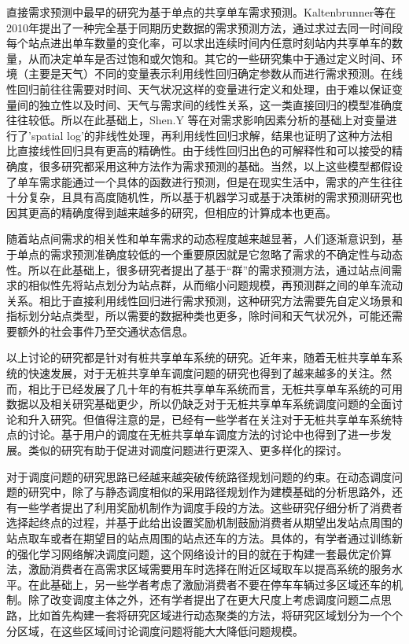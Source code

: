 \documentclass[]{tongjithesis}
\numberwithin{equation}{chapter}
\begin{document}
直接需求预测中最早的研究为基于单点的共享单车需求预测。Kaltenbrunner等在2010年提出了一种完全基于同期历史数据的需求预测方法\cite{kaltenbrunner2010urban}，通过求过去同一时间段每个站点进出单车数量的变化率，可以求出连续时间内任意时刻站内共享单车的数量，从而决定单车是否过饱和或欠饱和。其它的一些研究集中于通过定义时间、环境（主要是天气）不同的变量表示利用线性回归确定参数从而进行需求预测。在线性回归前往往需要对时间、天气状况这样的变量进行定义和处理，由于难以保证变量间的独立性以及时间、天气与需求间的线性关系，这一类直接回归的模型准确度往往较低。所以在此基础上，Shen.Y 等在对需求影响因素分析的基础上对变量进行了’spatial log’的非线性处理，再利用线性回归求解，结果也证明了这种方法相比直接线性回归具有更高的精确性\cite{shen2018understanding}。由于线性回归出色的可解释性和可以接受的精确度，很多研究都采用这种方法作为需求预测的基础。当然，以上这些模型都假设了单车需求能通过一个具体的函数进行预测，但是在现实生活中，需求的产生往往十分复杂，且具有高度随机性，所以基于机器学习\cite{xu2020hybrid}或基于决策树\cite{ve2020rule}的需求预测研究也因其更高的精确度得到越来越多的研究，但相应的计算成本也更高。

随着站点间需求的相关性和单车需求的动态程度越来越显著，人们逐渐意识到，基于单点的需求预测准确度较低的一个重要原因就是它忽略了需求的不确定性与动态性。所以在此基础上，很多研究者提出了基于“群”的需求预测方法\cite{chen2016dynamic,hulot2018towards}，通过站点间需求的相似性先将站点划分为站点群，从而缩小问题规模，再预测群之间的单车流动关系。相比于直接利用线性回归进行需求预测，这种研究方法需要先自定义场景和指标划分站点类型，所以需要的数据种类也更多，除时间和天气状况外，可能还需要额外的社会事件乃至交通状态信息。

以上讨论的研究都是针对有桩共享单车系统的研究。近年来，随着无桩共享单车系统的快速发展，对于无桩共享单车调度问题的研究也得到了越来越多的关注。然而，相比于已经发展了几十年的有桩共享单车系统而言，无桩共享单车系统的可用数据以及相关研究基础更少，所以仍缺乏对于无桩共享单车系统调度问题的全面讨论和升入研究。但值得注意的是，已经有一些学者在关注对于无桩共享单车系统特点的讨论\cite{shen2018understanding,li2019operating,xing2020exploring}。基于用户的调度在无桩共享单车调度方法的讨论中也得到了进一步发展。类似的研究有助于促进对调度问题进行更深入、更多样化的探讨。

对于调度问题的研究思路已经越来越突破传统路径规划问题的约束。在动态调度问题的研究中，除了与静态调度相似的采用路径规划作为建模基础的分析思路外，还有一些学者提出了利用奖励机制作为调度手段的方法\cite{fricker2016incentives,ghosh2017incentivizing}。这些研究仔细分析了消费者选择起终点的过程，并基于此给出设置奖励机制鼓励消费者从期望出发站点周围的站点取车或者在期望目的站点周围的站点还车的方法。具体的，有学者通过训练新的强化学习网络解决调度问题，这个网络设计的目的就在于构建一套最优定价算法，激励消费者在高需求区域需要用车时选择在附近区域取车以提高系统的服务水平\cite{pan2019deep}。在此基础上，另一些学者考虑了激励消费者不要在停车车辆过多区域还车的机制\cite{duan2019optimizing,ji2020does}。除了改变调度主体之外，还有学者提出了在更大尺度上考虑调度问题二点思路，比如首先构建一套将研究区域进行动态聚类的方法，将研究区域划分为一个个分区域，在这些区域间讨论调度问题将能大大降低问题规模\cite{caggiani2017dynamic}。
\end{document}
